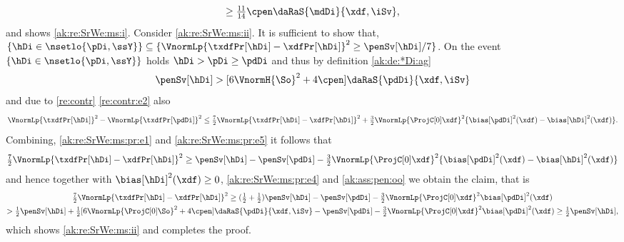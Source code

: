 \begin{pro}
\begin{multline*}
    \geq\tfrac{11}{14}\cpen\daRaS{\mdDi}{\xdf,\iSv},
  \end{multline*}
  and shows \ref{ak:re:SrWe:ms:i}.  Consider \ref{ak:re:SrWe:ms:ii}. It is sufficient to show that,
  $\{\hDi\in\nsetlo{\pDi,\ssY}\}\subseteq
  \{\VnormLp{\txdfPr[\hDi]-\xdfPr[\hDi]}^2\geq\penSv[\hDi]/7\}$.  On the
  event $\{\hDi\in\nsetlo{\pDi,\ssY}\}$ holds $\hDi>\pDi\geq\pdDi$ and
  thus by definition \eqref{ak:de:*Di:ag}
  \begin{equation}\label{ak:re:SrWe:ms:pr:e4}
    \penSv[\hDi] > [6\VnormH{\So}^2+ 4\cpen] \daRaS{\pdDi}{\xdf,\iSv}
  \end{equation}
  and due to \cref{re:contr} \ref{re:contr:e2} also
  \begin{equation}\label{ak:re:SrWe:ms:pr:e5}
    \VnormLp{\txdfPr[\hDi]}^2-\VnormLp{\txdfPr[\pdDi]}^2\leq
    \tfrac{7}{2}\VnormLp{\txdfPr[\hDi]-\xdfPr[\hDi]}^2+\tfrac{3}{2}\VnormLp{\ProjC[0]\xdf}^2
    \{\bias[\pdDi]^2(\xdf)-\bias[\hDi]^2(\xdf)\}.
  \end{equation}
  Combining, \eqref{ak:re:SrWe:ms:pr:e1} and \eqref{ak:re:SrWe:ms:pr:e5} it
  follows that
  \begin{multline*}
    \tfrac{7}{2}\VnormLp{\txdfPr[\hDi]-\xdfPr[\hDi]}^2\geq
    \penSv[\hDi]-\penSv[\pdDi]  -\tfrac{3}{2}\VnormLp{\ProjC[0]\xdf}^2
    \{\bias[\pdDi]^2(\xdf)-\bias[\hDi]^2(\xdf)\}\hfill
  \end{multline*}
  and hence together with $\bias[\hDi]^2(\xdf)\geq0$,
  \eqref{ak:re:SrWe:ms:pr:e4} and \ref{ak:ass:pen:oo} we obtain the claim,
  that is
  \begin{multline*}
    \tfrac{7}{2}\VnormLp{\txdfPr[\hDi]-\xdfPr[\hDi]}^2\geq
    (\tfrac{1}{2}+\tfrac{1}{2})\penSv[\hDi]-\penSv[\pdDi]  -\tfrac{3}{2}\VnormLp{\ProjC[0]\xdf}^2
    \bias[\pdDi]^2(\xdf)\\
    >\tfrac{1}{2}\penSv[\hDi]+\tfrac{1}{2}[6\VnormLp{\ProjC[0]\So}^2+ 4\cpen]
    \daRaS{\pdDi}{\xdf,\iSv}-\penSv[\pdDi]-\tfrac{3}{2}\VnormLp{\ProjC[0]\xdf}^2
    \bias[\pdDi]^2(\xdf)
    \geq\tfrac{1}{2}\penSv[\hDi],
  \end{multline*}
  which shows \ref{ak:re:SrWe:ms:ii} and completes the proof.\proEnd
\end{pro}



